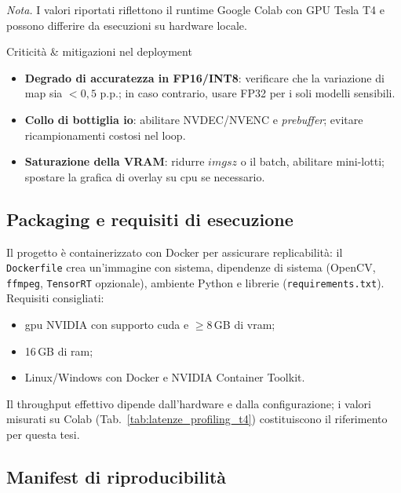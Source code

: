 \documentclass[12pt,a4paper,openright,twoside]{book}
\begin{document}
\noindent\emph{Nota.} I valori riportati riflettono il runtime Google Colab con GPU Tesla T4 e possono differire da esecuzioni su hardware locale.

\begin{riskbox}{Criticità \& mitigazioni nel deployment}
  \label{box:rischi-mitigazioni-deploy}
  \begin{itemize}
    \item \textbf{Degrado di accuratezza in FP16/INT8}: verificare che la variazione di \ac{map} sia $<0{,}5$ p.p.; in caso contrario,
    usare FP32 per i soli modelli sensibili.
    \item \textbf{Collo di bottiglia \ac{io}}: abilitare NVDEC/NVENC e \emph{prebuffer}; evitare ricampionamenti costosi nel loop.
    \item \textbf{Saturazione della VRAM}: ridurre $imgsz$ o il batch, abilitare mini-lotti; spostare la grafica di overlay su \ac{cpu} se necessario.
  \end{itemize}
\end{riskbox}

\subsection{Packaging e requisiti di esecuzione}
\label{sec:packaging-deployment}

Il progetto è containerizzato con Docker per assicurare replicabilità:
il \texttt{Dockerfile} crea un'immagine con sistema, dipendenze di sistema
(OpenCV, \texttt{ffmpeg}, \texttt{TensorRT} opzionale), ambiente Python e librerie
(\texttt{requirements.txt}). Requisiti consigliati:
\begin{itemize}
  \item \ac{gpu} NVIDIA con supporto \ac{cuda} e $\geq$8\,GB di \ac{vram};
  \item 16\,GB di \ac{ram};
  \item Linux/Windows con Docker e NVIDIA Container Toolkit.
\end{itemize}

Il throughput effettivo dipende dall'hardware e dalla configurazione; i valori misurati su Colab (Tab.~\ref{tab:latenze_profiling_t4})
costituiscono il riferimento per questa tesi.

\subsection{Manifest di riproducibilità}
\label{subsec:manifest-reprod}
\end{document}
